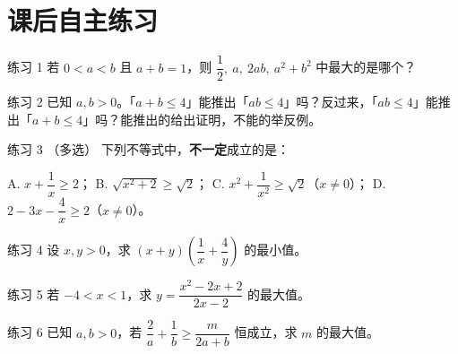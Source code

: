 \section{课后自主练习}


\begin{problem}{练习 1}
若 $0<a<b$ 且 $a+b=1$，则 $\dfrac12,\ a,\ 2ab,\ a^2+b^2$ 中最大的是哪个？
\end{problem}

\begin{problem}{练习 2}
已知 $a,b>0$。「$a+b\le 4$」能推出「$ab\le 4$」吗？反过来，「$ab\le 4$」能推出「$a+b\le 4$」吗？能推出的给出证明，不能的举反例。
\end{problem}

\begin{problem}{练习 3 （多选）}
下列不等式中，\textbf{不一定}成立的是：

A. $x+\dfrac1x\ge 2$；\quad
B. $\sqrt{x^2+2}\ge\sqrt2$；\quad
C. $x^2+\dfrac{1}{x^2}\ge\sqrt2$（$x\ne0$）；\quad
D. $2-3x-\dfrac4x\ge 2$（$x\ne 0$）。
\end{problem}

\begin{problem}{练习 4}
设 $x,y>0$，求 $(x+y)\left(\dfrac1x+\dfrac4y\right)$ 的最小值。
\end{problem}

\begin{problem}{练习 5 \starred}
若 $-4<x<1$，求 $y=\dfrac{x^2-2x+2}{2x-2}$ 的最大值。
\end{problem}

\begin{problem}{练习 6 \starred}
已知 $a,b>0$，若 $\dfrac2a+\dfrac1b\ge\dfrac{m}{2a+b}$ 恒成立，求 $m$ 的最大值。
\end{problem}

